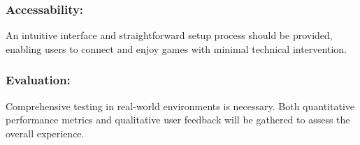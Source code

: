 \subsubsection{Accessability:}
	      An intuitive interface and straightforward setup process should be provided, enabling users to connect and enjoy games with minimal technical intervention.

\subsubsection{Evaluation:}
	      Comprehensive testing in real-world environments is necessary. Both quantitative performance metrics and qualitative user feedback will be gathered to assess the overall experience.


